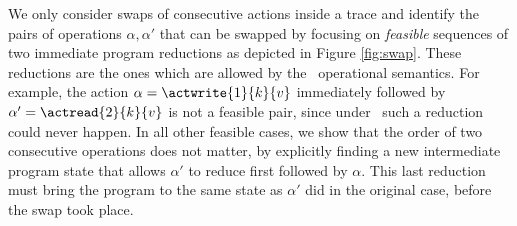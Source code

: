 We only consider swaps of consecutive actions inside a trace and identify the pairs of operations $\alpha, \alpha'$ that can be swapped by focusing on \textit{feasible} sequences of two immediate program reductions as depicted in Figure \ref{fig:swap}. These reductions are the ones which are allowed by the \tpl\ operational semantics. For example, the action $\alpha = \actwrite{1}{k}{v}$ immediately followed by $\alpha' = \actread{2}{k}{v}$ is not a feasible pair, since under \tpl\ such a reduction could never happen. In all other feasible cases, we show that the order of two consecutive operations does not matter, by explicitly finding a new intermediate program state that allows $\alpha'$ to reduce first followed by $\alpha$. This last reduction must bring the program to the same state as $\alpha'$ did in the original case, before the swap took place.
